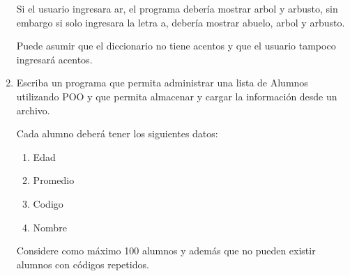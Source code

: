 \documentclass{article}
\begin{document}
\begin{enumerate}
	Si el usuario ingresara ar, el programa debería mostrar arbol
        y arbusto, sin embargo si solo ingresara la letra a, debería
        mostrar abuelo, arbol y arbusto.

	Puede asumir que el diccionario no tiene acentos y que el usuario
        tampoco ingresará acentos.

  \item Escriba un programa que permita administrar una lista de Alumnos
        utilizando POO y que permita almacenar y cargar la información
        desde un archivo.

        Cada alumno deberá tener los siguientes datos:
    \begin{enumerate}
      \item Edad
      \item Promedio
      \item Codigo
      \item Nombre
    \end{enumerate}

        Considere como máximo 100 alumnos y además que no pueden existir
        alumnos con códigos repetidos.

\end{enumerate}
\end{document}

